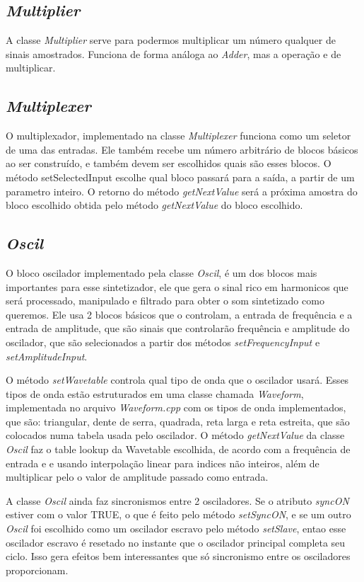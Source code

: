 \documentclass{article}
\begin{document}
\subsection{\emph{Multiplier}}
A classe \emph{Multiplier} serve para podermos multiplicar um número qualquer de sinais amostrados. Funciona de forma análoga ao \emph{Adder}, mas a operação e de multiplicar.
\subsection{\emph{Multiplexer}}
O multiplexador, implementado na classe \emph{Multiplexer} funciona como um seletor de uma das entradas. Ele também recebe um número arbitrário de blocos 
básicos ao ser construído, e também devem ser escolhidos quais são esses blocos. O método setSelectedInput escolhe qual bloco passará para a saída, 
a partir de um parametro inteiro. O retorno do método \emph{getNextValue} será a próxima amostra do bloco escolhido obtida pelo método \emph{getNextValue} do bloco escolhido.
\subsection{\emph{Oscil}}
O bloco oscilador implementado pela classe \emph{Oscil}, é um dos blocos mais importantes para esse sintetizador, ele que gera o sinal rico em harmonicos que
 será processado, manipulado e filtrado para obter o som sintetizado como queremos.
Ele usa 2 blocos básicos que o controlam, a entrada de frequência e a entrada de amplitude, que são sinais que controlarão frequência e amplitude do oscilador, que são
selecionados a partir dos métodos \emph{setFrequencyInput} e \emph{setAmplitudeInput}. 


O método \emph{setWavetable} controla qual tipo de onda que o oscilador usará. Esses tipos de onda estão estruturados em uma classe chamada \emph{Waveform}, implementada no
arquivo \emph{Waveform.cpp} com os tipos de onda implementados, que são: triangular, dente de serra, quadrada, reta larga e reta estreita, que são colocados numa 
tabela usada pelo oscilador. O método \emph{getNextValue} da classe \emph{Oscil} faz o table lookup da Wavetable escolhida, de acordo com a frequência de entrada e
e usando interpolação linear para indices não inteiros, além de multiplicar pelo o valor de amplitude passado como entrada.


A classe \emph{Oscil} ainda faz sincronismos entre 2 osciladores. Se o atributo \emph{syncON} estiver com o valor TRUE, o que é feito pelo método
\emph{setSyncON}, e se um outro \emph{Oscil} foi escolhido como um oscilador escravo pelo método \emph{setSlave}, entao esse oscilador escravo é resetado 
no instante que o oscilador principal completa seu ciclo. Isso gera efeitos  bem interessantes que só sincronismo entre os osciladores proporcionam.
\end{document}
